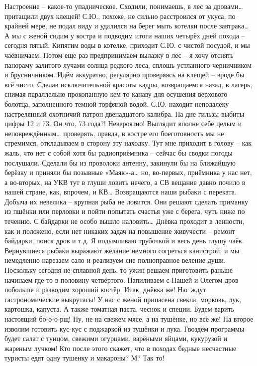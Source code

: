 Настроение – какое-то упадническое. Сходили, понимаешь, в лес за дровами… притащили двух клещей! С.Ю., похоже, не сильно расстроился от укуса, по крайней мере, не подал виду и удалился на берег мыть котелки после завтрака… А мы с женой сидим у костра и подводим итоги наших четырёх дней похода – сегодня пятый. Кипятим воды в котелке, приходит С.Ю. с чистой посудой, и мы чаёвничаем.
Потом еще раз предпринимаем вылазку в лес – я хочу отснять панораму залитого лучами солнца редкого леса, сплошь устланного черничником и брусничником. Идём аккуратно, регулярно проверяясь на клещей – вроде бы всё чисто. Сделав исключительной красоты кадры, возвращаемся назад, в лагерь, снимая параллельно прокопанную кем-то канаву для осушения верхового болотца, заполненного темной торфяной водой.
С.Ю. находит неподалёку настрелянный охотничий патрон двенадцатого калибра. На дне гильзы выбиты цифры 12 и 73. Он что, 73 года?! Невероятно! Выглядит вполне себе целым и неповреждённым… проверять, правда, в костре его боеготовность мы не стремимся, откладываем в сторону эту находку. 
Тут мне приходит в голову – как жаль, что нет с собой хотя бы радиоприёмника – сейчас бы сводки погоды послушали. Сделали бы из проволоки антенну, закинули бы на ближайшую берёзку и приняли бы позывные «Маяк»-а… но, во-первых, приёмника у нас нет, а во-вторых, на УКВ тут в глуши ловить нечего, а СВ вещание давно почило в нашей стране, как, впрочем, и КВ…
Возвращаются наши рыбаки с переката. Добыча их невелика – крупная рыба не ловится. Они решают сделать приманку из пшёнки или перловки и пойти попытать счастья уже с берега, чуть ниже по течению. С байдарки не особо вышло наловить…
Днёвка проходит в ленности, как и положено, если нет никаких задач на повышение живучести – ремонт байдарки, поиск дров и т.д. Я подымливаю трубочкой и весь день глушу чаёк. Вернувшиеся рыбаки выражают желание немного согреться канистрой, и мы немедленно нарезаем сало и реализуем сие полноправное веление души.
Поскольку сегодня не сплавной день, то ужин решаем приготовить раньше – начинаем где-то в половину четвёртого. Напиливаем с Пашей и Олегом дров побольше и разводим хороший костёр. Итак, днёвка же! Нас ждут гастрономические выкрутасы! У нас с женой припасена свекла, морковь, лук, картошка, капуста. А также томатная паста, чеснок и специи. Будем варить настоящий бо-о-о-рщ! Ну, не на свежем мясе, а на тушёнке, но всё же! На второе изволим готовить кус-кус с поджаркой из тушёнки и лука. Гвоздём программы будет салат с тунцом, свежими огурцами, варёными яйцами, кукурузой и жареным лучком! Кто после этого скажет, что в походах бедные несчастные туристы едят одну тушенку и макароны? М? Так то!
